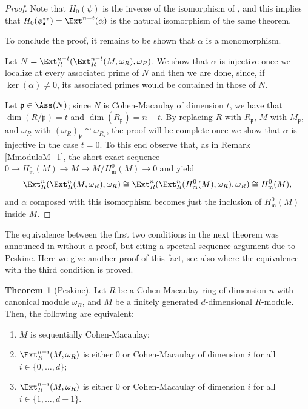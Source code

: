 \documentclass[12pt]{amsart}
\theoremstyle{definition}
\newtheorem{theorem}{Theorem}[section]
\theoremstyle{definition}
\newcommand{\m}{\mathfrak{m}}
\def\frk{\mathfrak}               %
\def\pp{{\frk p}}
\begin{document}
\begin{proof}
Note that $H_0(\psi)$ is the inverse of the isomorphism of \cite[Theorem 3.3.10 (c) (iii)]{BH93}, and this implies that $H_0(\phi^{**}_\bullet) = \Ext^{n-t}(\alpha)$ is the natural isomorphism of the same theorem.


   
   
To conclude the proof, it remains to be shown that $\alpha$ is a monomorphism. 

\noindent
Let $N = \Ext^{n-t}_R(\Ext^{n-t}_R(M,\omega_R),\omega_R)$. We show that $\alpha$ is injective once we localize at every associated prime of $N$ and then we are done, since, if $\ker(\alpha) \ne 0$, its associated primes would be contained in those of $N$.

  \noindent Let $\pp \in \Ass(N)$; since $N$ is Cohen-Macaulay of dimension $t$, we have that $\dim(R/\pp) = t$  and  $\dim(R_\pp) = n-t$. By replacing $R$ with $R_\pp$, $M$ with $M_\pp$, and $\omega_R$ with $(\omega_R)_\pp \cong \omega_{R_\pp}$, the proof will be complete once we show that $\alpha$ is injective in the case $t=0$. To this end observe that, as in Remark \ref{MmoduloM_1}, the short exact sequence $0 \to H^0_\m(M) \to M \to M/H^0_\m(M) \to 0$ and \cite[Theorem 3.3.10 (c) (iii)]{BH93} yield 
\[
\Ext^n_R(\Ext^n_R(M,\omega_R),\omega_R) \cong \Ext^n_R(\Ext^n_R(H^0_\m(M),\omega_R),\omega_R) \cong H^0_\m(M),
\]
and $\alpha$ composed with this isomorphism becomes just the inclusion of $H^0_\m(M)$ inside $M$.
\end{proof}


The equivalence between the first two conditions in the next theorem was announced in \cite{St96} without a proof, but citing a spectral sequence argument due to Peskine. Here we give another proof of this fact, see also \cite[Theorem 5.5]{Sch99} where the equivalence with the third condition is proved.


\begin{theorem}[Peskine]\label{peskine}
Let $R$ be a Cohen-Macaulay ring of dimension $n$ with canonical module $\omega_R$, and $M$ be a finitely generated $d$-dimensional $R$-module. Then, the following are equivalent:
\begin{enumerate}[(1)]
\item $M$ is sequentially Cohen-Macaulay;
\item $\Ext_R^{n-i}(M,\omega_R)$ is either $0$ or Cohen-Macaulay of dimension $i$ for all $i \in \{0,\ldots,d\}$;
\item $\Ext_R^{n-i}(M,\omega_R)$ is either $0$ or Cohen-Macaulay of dimension $i$ for all $i \in \{1,\ldots,d-1\}$.
\end{enumerate}
\end{theorem}
\end{document}
